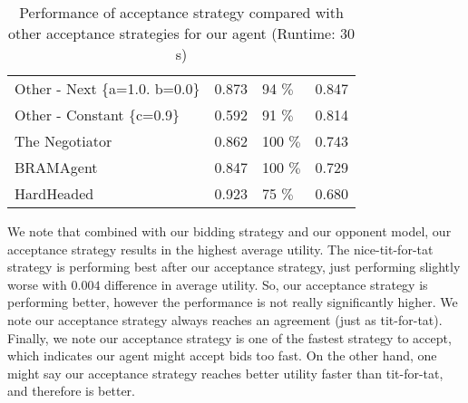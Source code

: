 \begin{table}[H]
\begin{tabular}{m{4.0cm}m{3.0cm}m{3.0cm}m{3.0cm}}
  Other - Next \{a=1.0. b=0.0\} & 0.873                                                                 & 94 $\%$                                                              & 0.847                                                       \\ 
  Other - Constant \{c=0.9\}    & 0.592                                                                 & 91 $\%$                                                              & 0.814                                                       \\ 
  The Negotiator                & 0.862                                                                 & 100  $\%$                                                            & 0.743                                                       \\ 
  BRAMAgent                     & 0.847                                                                 & 100 $\%$                                                             & 0.729                                                       \\ 
  HardHeaded                    & 0.923                                                                 & 75 $\%$                                                              & 0.680                                                      
  \\
  \bottomrule
\end{tabular}
\caption{Performance of acceptance strategy compared with other acceptance strategies for our agent (Runtime: $30$s) \label{table:as-results}}
\end{table}

We note that combined with our bidding strategy and our opponent model, our acceptance strategy results in the highest average utility.
The nice-tit-for-tat strategy is performing best after our acceptance strategy, just performing slightly worse with $0.004$ difference in average utility.
So, our acceptance strategy is performing better, however the performance is not really significantly higher.
We note our acceptance strategy always reaches an agreement (just as tit-for-tat).
Finally, we note our acceptance strategy is one of the fastest strategy to accept, which indicates our agent might accept bids too fast.
On the other hand, one might say our acceptance strategy reaches better utility faster than tit-for-tat, and therefore is better.

